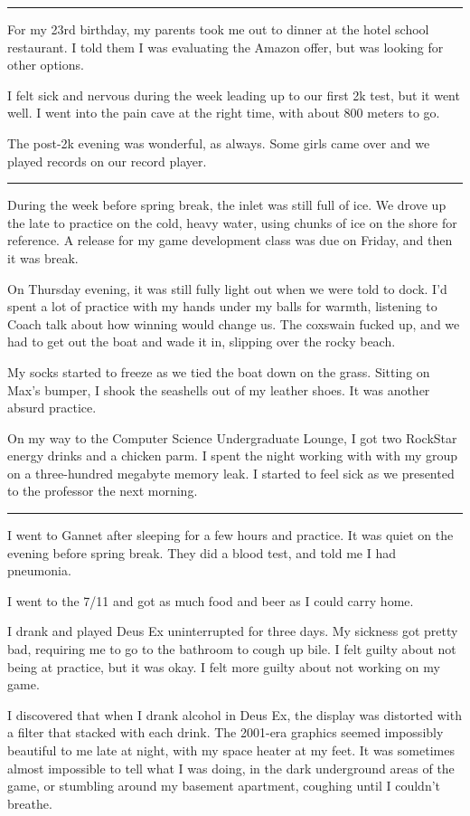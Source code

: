 \plainfancybreak{12pt}{2}{}

For my 23rd birthday, my parents took me out to dinner at the hotel school
restaurant.  I told them I was evaluating the Amazon offer, but was looking for
other options.

I felt sick and nervous during the week leading up to our first 2k test, but it
went well.  I went into the pain cave at the right time, with about 800 meters
to go.  

The post-2k evening was wonderful, as always.  Some girls came over and we
played records on our record player.  

\plainfancybreak{12pt}{2}{}

During the week before spring break, the inlet was still full of ice.  We drove
up the late to practice on the cold, heavy water, using chunks of ice on the
shore for reference.  A release for my game development class was due on Friday,
and then it was break.

On Thursday evening, it was still fully light out when we were told to dock.
I'd spent a lot of practice with my hands under my balls for warmth, listening
to Coach talk about how winning would change us.   The coxswain fucked up, and
we had to get out the boat and wade it in, slipping over the rocky beach. 

My socks started to freeze as we tied the boat down on the grass.  Sitting on
Max's bumper, I shook the seashells out of my leather shoes.  It was another
absurd practice.  

On my way to the Computer Science Undergraduate Lounge, I got two RockStar
energy drinks and a chicken parm.  I spent the night working with with my group
on a three-hundred megabyte memory leak.  I started to feel sick as we presented
to the professor the next morning.

\plainfancybreak{12pt}{2}{}

I went to Gannet after sleeping for a few hours and practice.  It was quiet on
the evening before spring break.  They did a blood test, and told me I had
pneumonia.

I went to the 7/11 and got as much food and beer as I could carry home.  

I drank and played Deus Ex uninterrupted for three days.  My sickness got pretty
bad, requiring me to go to the bathroom to cough up bile.  I felt guilty about
not being at practice, but it was okay.  I felt more guilty about not working on
my game. 
 
I discovered that when I drank alcohol in Deus Ex, the display was distorted
with a filter that stacked with each drink.  The 2001-era graphics seemed
impossibly beautiful to me late at night, with my space heater at my feet.  It
was sometimes almost impossible to tell what I was doing, in the dark
underground areas of the game, or stumbling around my basement apartment,
coughing until I couldn't breathe.

